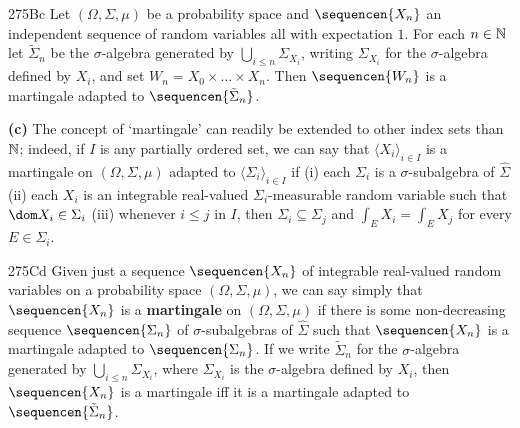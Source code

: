 \spheader 275Bc Let $(\Omega,\Sigma,\mu)$ be a probability space
and $\sequencen{X_n}$ an independent sequence of
random variables all with expectation $1$.   For each $n\in\Bbb N$ let
$\tilde\Sigma_n$ be the
$\sigma$-algebra generated by $\bigcup_{i\le n}\Sigma_{X_i}$, writing
$\Sigma_{X_i}$ for the
$\sigma$-algebra defined by $X_i$, and set
$W_n=X_0\times\ldots\times X_n$.   Then $\sequencen{W_n}$ is a
martingale adapted to $\sequencen{\tilde\Sigma_n}$.

{\bf (c)} The concept of `martingale' can readily be
extended to other index sets than $\Bbb N$;  indeed, if $I$ is any
partially ordered set, we can say that $\langle X_i\rangle_{i\in I}$ is
a martingale on $(\Omega,\Sigma,\mu)$ adapted to
$\langle\Sigma_i\rangle_{i\in I}$ if (i) each $\Sigma_i$ is a
$\sigma$-subalgebra of $\hat\Sigma$ (ii) each $X_i$ is an integrable
real-valued $\Sigma_i$-measurable random variable such that
$\dom X_i\in\Sigma_i$ (iii) whenever $i\le j$ in $I$, then
$\Sigma_i\subseteq\Sigma_j$ and $\int_EX_i=\int_EX_j$ for every
$E\in\Sigma_i$.   %

\spheader 275Cd Given just a sequence $\sequencen{X_n}$ of
integrable
real-valued random variables on a probability space
$(\Omega,\Sigma,\mu)$, we can say simply that $\sequencen{X_n}$ is a
{\bf martingale} on $(\Omega,\Sigma,\mu)$ if there is some
non-decreasing
sequence $\sequencen{\Sigma_n}$ of $\sigma$-subalgebras of
$\hat\Sigma$ such that
$\sequencen{X_n}$ is a martingale
adapted to $\sequencen{\Sigma_n}$.   If we write $\tilde\Sigma_n$ for
the $\sigma$-algebra generated by $\bigcup_{i\le n}\Sigma_{X_i}$, where
$\Sigma_{X_i}$ is the
$\sigma$-algebra defined by $X_i$,
then $\sequencen{X_n}$ is a martingale
iff it is a martingale adapted to
$\sequencen{\tilde\Sigma_n}$.

